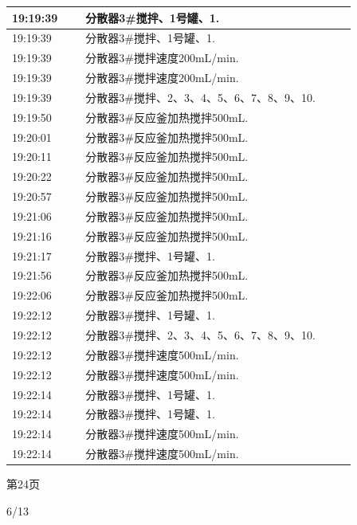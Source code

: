 \documentclass[UTF8,10pt,a4paper,fontset=fandol]{ctexart}
\newcommand{\handwritten}[1]{#1}
\begin{document}
\begin{center}
\begin{minipage}[t]{0.47\linewidth}
\vspace{2mm}
\scriptsize
\begin{tabular}{|p{0.19\linewidth}|p{0.70\linewidth}|}
\hline
19:19:39 & 分散器3#搅拌、1号罐、1. \\ \hline
19:19:39 & 分散器3#搅拌、1号罐、1. \\ \hline
19:19:39 & 分散器3#搅拌速度200mL/min. \\ \hline
19:19:39 & 分散器3#搅拌速度200mL/min. \\ \hline
19:19:39 & 分散器3#搅拌、2、3、4、5、6、7、8、9、10. \\ \hline
19:19:50 & 分散器3#反应釜加热搅拌500mL. \\ \hline
19:20:01 & 分散器3#反应釜加热搅拌500mL. \\ \hline
19:20:11 & 分散器3#反应釜加热搅拌500mL. \\ \hline
19:20:22 & 分散器3#反应釜加热搅拌500mL. \\ \hline
19:20:57 & 分散器3#反应釜加热搅拌500mL. \\ \hline
19:21:06 & 分散器3#反应釜加热搅拌500mL. \\ \hline
19:21:16 & 分散器3#反应釜加热搅拌500mL. \\ \hline
19:21:17 & 分散器3#搅拌、1号罐、1. \\ \hline
19:21:56 & 分散器3#反应釜加热搅拌500mL. \\ \hline
19:22:06 & 分散器3#反应釜加热搅拌500mL. \\ \hline
19:22:12 & 分散器3#搅拌、1号罐、1. \\ \hline
19:22:12 & 分散器3#搅拌、2、3、4、5、6、7、8、9、10. \\ \hline
19:22:12 & 分散器3#搅拌速度500mL/min. \\ \hline
19:22:12 & 分散器3#搅拌速度500mL/min. \\ \hline
19:22:14 & 分散器3#搅拌、1号罐、1. \\ \hline
19:22:14 & 分散器3#搅拌、1号罐、1. \\ \hline
19:22:14 & 分散器3#搅拌速度500mL/min. \\ \hline
19:22:14 & 分散器3#搅拌速度500mL/min. \\ \hline
\end{tabular}

\vspace{2mm}
{\tiny 第24页}

\vspace{5mm}
\handwritten{6/13}
\end{minipage}
\end{center}
\end{document}
